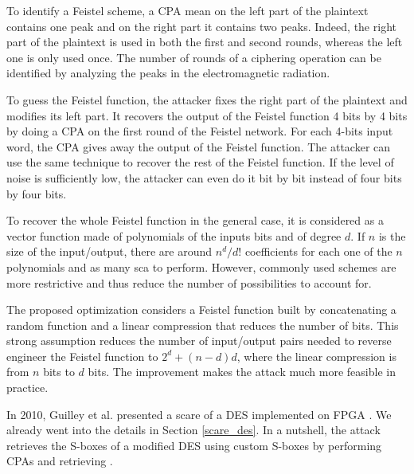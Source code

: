 \documentclass[11pt]{sdm}
\begin{document}
To identify a Feistel scheme, a CPA mean on the left part of the plaintext contains one peak and on the right part it contains two peaks.
Indeed, the right part of the plaintext is used in both the first and second rounds, whereas the left one is only used once.
The number of rounds of a ciphering operation can be identified by analyzing the peaks in the electromagnetic radiation.

To guess the Feistel function, the attacker fixes the right part of the plaintext and modifies its left part.
It recovers the output of the Feistel function 4 bits by 4 bits by doing a CPA on the first round of the Feistel network.
For each 4-bits input word, the CPA gives away the output of the Feistel function.
The attacker can use the same technique to recover the rest of the Feistel function.
If the level of noise is sufficiently low, the attacker can even do it bit by bit instead of four bits by four bits.

To recover the whole Feistel function in the general case, it is considered as a vector function made of polynomials of the inputs bits and of degree $d$.
If $n$ is the size of the input/output, there are around $n^d/d!$ coefficients for each one of the $n$ polynomials and as many \gls{sca} to perform.
However, commonly used schemes are more restrictive and thus reduce the number of possibilities to account for.

The proposed optimization considers a Feistel function built by concatenating a random function and a linear compression that reduces the number of bits.
This strong assumption reduces the number of input/output pairs needed to reverse engineer the Feistel function to $2^d + (n-d)d$, where the linear compression is from $n$ bits to $d$ bits.
The improvement makes the attack much more feasible in practice. 


In 2010, Guilley et al. presented a \gls{scare} of a DES implemented on FPGA \parencite{Guilley_Sauvage_Micolod_Réal_Valette_2010}.
We already went into the details in Section \ref{scare_des}.
In a nutshell, the attack retrieves the S-boxes of a modified DES using custom S-boxes by performing CPAs and retrieving .




\end{document}
